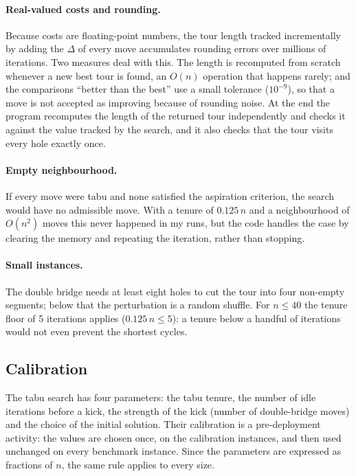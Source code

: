 \documentclass[11pt,a4paper]{article}
\begin{document}
\paragraph{Real-valued costs and rounding.}
Because costs are floating-point numbers, the tour length tracked incrementally by adding the
$\Delta$ of every move accumulates rounding errors over millions of iterations. Two measures
deal with this. The length is recomputed from scratch whenever a new best tour is found, an
$O(n)$ operation that happens rarely; and the comparisons ``better than the best'' use a small
tolerance ($10^{-9}$), so that a move is not accepted as improving because of rounding noise.
At the end the program recomputes the length of the returned tour independently and checks it
against the value tracked by the search, and it also checks that the tour visits every hole
exactly once.

\paragraph{Empty neighbourhood.}
If every move were tabu and none satisfied the aspiration criterion, the search would have no
admissible move. With a tenure of $0.125\,n$ and a neighbourhood of $O(n^2)$ moves this never
happened in my runs, but the code handles the case by clearing the memory and repeating the
iteration, rather than stopping.

\paragraph{Small instances.}
The double bridge needs at least eight holes to cut the tour into four non-empty segments;
below that the perturbation is a random shuffle. For $n\le40$ the tenure floor of 5
iterations applies ($0.125\,n\le5$): a tenure below a handful of iterations would not even
prevent the shortest cycles.

\subsection{Calibration}\label{sec:calib}
The tabu search has four parameters: the tabu tenure, the number of idle iterations before a
kick, the strength of the kick (number of double-bridge moves) and the choice of the initial
solution. Their calibration is a pre-deployment activity: the values are chosen once, on the
calibration instances, and then used unchanged on every benchmark instance. Since the
parameters are expressed as fractions of $n$, the same rule applies to every size.
\end{document}

